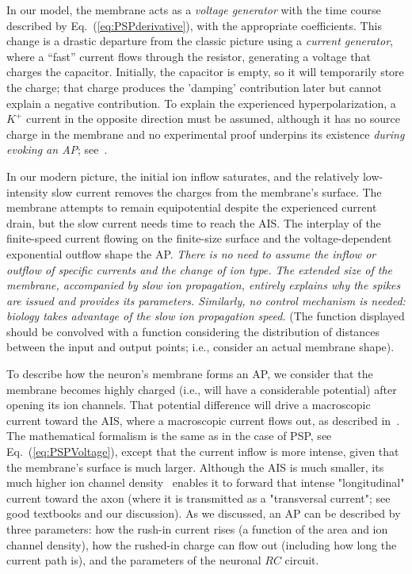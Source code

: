 In our model, the membrane acts as a \emph{voltage generator} with
the time course described by Eq.~(\ref{eq:PSPderivative}), 
with the appropriate coefficients. This change is a drastic departure from the classic picture using a \emph{current generator},
where a ``fast'' current flows through the resistor, generating a voltage 
that charges the capacitor. Initially, the capacitor is empty, so it
will temporarily store the charge; that charge produces the 'damping' contribution later but cannot explain a negative contribution. To explain the experienced hyperpolarization, a $K^+$ current in the opposite direction must be assumed, although it has no source charge in the membrane and no experimental proof underpins its existence \textit{during evoking an 
AP}; see~\cite{BeanActionPotential:2007}. 

In our
modern picture, the initial ion inflow saturates, and the relatively
low-intensity slow current removes the charges from the membrane's surface.
The membrane attempts to remain equipotential despite the experienced
current drain, but the slow current needs time to reach the 
AIS.
The interplay of the finite-speed current flowing on the finite-size
surface and the voltage-dependent exponential outflow shape the
AP.
\emph{There is no need to assume the inflow or outflow of specific
	currents and the change of ion type. The extended size of the membrane,
	accompanied by slow ion propagation, entirely explains why the
	spikes are issued and provides its parameters. Similarly, no control
	mechanism is needed: biology takes advantage of the slow ion propagation
	speed.} (The function displayed should be convolved with a function
considering the distribution of distances between the input
and output points; i.e., consider an actual membrane shape).




To describe how the neuron's membrane forms an 
AP, we consider
that the membrane becomes highly charged (i.e., will have a considerable
potential) after opening its ion channels. That potential difference
will drive a macroscopic current toward the 
AIS, where a macroscopic
current flows out, as described in~\cite{ActionPotentialGenerationNatrium:2008}.
The mathematical formalism is the same as in the case of 
PSP,
see Eq.~(\ref{eq:PSPVoltage}), except that the current inflow is
more intense, given that the membrane's surface is much larger. Although
the 
AIS is much smaller, its much higher ion channel density~\cite{ActionPotentialGenerationNatrium:2008}
enables it to forward that intense "longitudinal"
current toward the axon (where it is transmitted as a "transversal
current"; see good textbooks and our discussion).
As we discussed, an 
AP can be described by three parameters: how the rush-in current rises (a function of the area and ion channel density), how the rushed-in charge
can flow out (including how long the current path is), and
the parameters of the neuronal $RC$ circuit.


